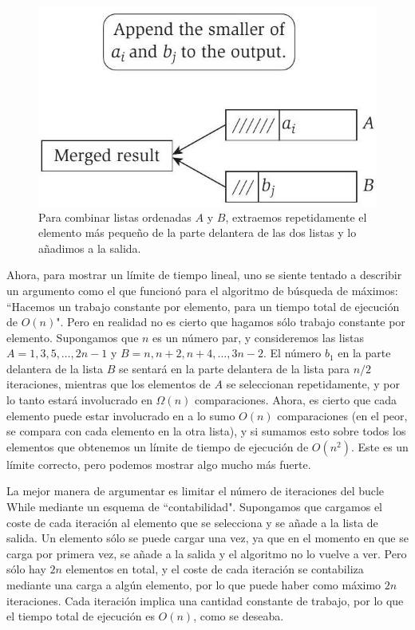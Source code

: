 \documentclass[a4paper, 12pt]{book}
\theoremstyle{dotless}
\begin{document}
\begin{figure}[h!]
    \centering
\includegraphics[scale=0.35]{./Imagenes-Seccion2/2023_08_07_379b6f7f3185549667e3g-03}
    \caption{Para combinar listas ordenadas $A$ y $B$, extraemos repetidamente el elemento más pequeño de la parte delantera de las dos listas y lo añadimos a la salida. }
    \label{fig:enter-label}
\end{figure}

Ahora, para mostrar un límite de tiempo lineal, uno se siente tentado a describir un argumento como el que funcionó para el algoritmo de búsqueda de máximos: ``Hacemos un trabajo constante por elemento, para un tiempo total de ejecución de $O(n)$". Pero en realidad no es cierto que hagamos sólo trabajo constante por elemento. Supongamos que $n$ es un número par, y consideremos las listas $A=1,3,5, \ldots, 2 n-1$ y $B=n, n+2, n+4, \ldots, 3 n-2$. El número $b_{1}$ en la parte delantera de la lista $B$ se sentará en la parte delantera de la lista para $n / 2$ iteraciones, mientras que los elementos de $A$ se seleccionan repetidamente, y por lo tanto estará involucrado en $\Omega(n)$ comparaciones. Ahora, es cierto que cada elemento puede estar involucrado en a lo sumo $ O (n) $ comparaciones (en el peor, se compara con cada elemento en la otra lista), y si sumamos esto sobre todos los elementos que obtenemos un límite de tiempo de ejecución de $ O\left (n^ {2}\right) $. Este es un límite correcto, pero podemos mostrar algo mucho más fuerte.

La mejor manera de argumentar es limitar el número de iteraciones del bucle While mediante un esquema de ``contabilidad". Supongamos que cargamos el coste de cada iteración al elemento que se selecciona y se añade a la lista de salida. Un elemento sólo se puede cargar una vez, ya que en el momento en que se carga por primera vez, se añade a la salida y el algoritmo no lo vuelve a ver. Pero sólo hay $2n$ elementos en total, y el coste de cada iteración se contabiliza mediante una carga a algún elemento, por lo que puede haber como máximo $2 n$ iteraciones. Cada iteración implica una cantidad constante de trabajo, por lo que el tiempo total de ejecución es $O(n)$, como se deseaba.
\end{document}
